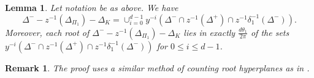 \documentclass[10pt,leqno]{article}
\newtheorem{lemma}[equation]{Lemma}
\newtheorem{remark}[equation]{Remark}
{\theorembodyfont{\rmfamily}
\newtheorem{theoremplain}[equation]{Theorem}
\newtheorem{remarkplain}[equation]{Remark}
\newtheorem{editorialremarkplain}[equation]{Editorial Remark}
\newtheorem{exampleplain}[equation]{Example}
\newtheorem{corollaryplain}[equation]{Corollary}
}
\def\le{\leqslant}
\def\d{\delta}
\def\D{\Delta}
\def\th{\theta}
\def\i{^{-1}}
\begin{document}
\begin{lemma} \label{tech}
Let notation be as above. We have $$\D^- - z \i(\D_{\Pi_1})-\D_K = \cup_{i=0}^{d-1} y^{-i}(\D^- \cap z \i(\D^+) \cap z \i \d_1 \i(\D^-)).$$ Moreover, each root of $\D^- - z \i(\D_{\Pi_1})-\D_K$ lies in exactly $\frac{d \th_1} {2\pi}$ of the sets $y^{-i}(\D^- \cap z \i(\D^+) \cap z \i \d_1 \i(\D^-))$ for $0 \le i \le d-1$.

\end{lemma}
\begin{remark}
The proof uses a similar method of counting root hyperplanes as in \cite[Lemma 2.1]{he_nie_minimal_finite}.
\end{remark}
\end{document}
